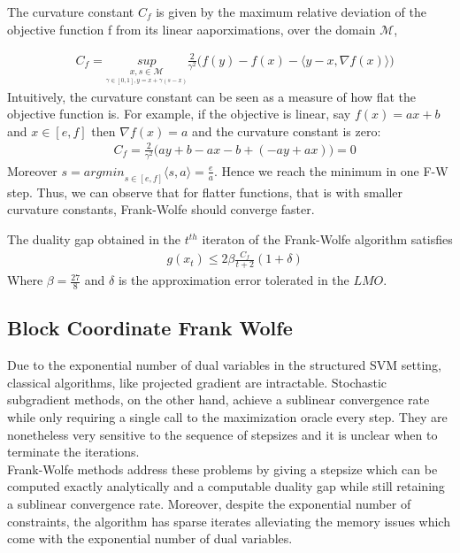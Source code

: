 \begin{definition}
  The curvature constant $C_{f}$ is given by the maximum relative deviation of
  the objective function f from its linear aaporximations, over the domain
  $\mathcal{M}$,
\end{definition}


\begin{align}
    &C_{f}= \underset{\underset{ \gamma\in[0,1],
y=x+\gamma(s-x)}{x,s\in\mathcal{M}}}{sup}\frac{2}{\gamma^{2}}\Big(f(y)- f(x)-
\langle y-x, \nabla f(x)\rangle\Big)
\end{align}
Intuitively, the curvature constant can be seen as a measure of how flat the
objective function is. For example, if the objective is linear, say $f(x)= ax+
b$ and $x\in[e,f]$ then $\nabla f(x)= a$ and the curvature constant is zero:
\begin{align}
    &C_{f}= \frac{2}{\gamma^{2}}\Big(ay+ b- ax- b +(-ay +ax)\Big)= 0
\end{align}
Moreover $s=\textit{argmin}_{s\in[e,f]}\langle s, a\rangle= \frac{e}{a}$. Hence
we reach the minimum in one F-W step. Thus, we can observe that for flatter
functions, that is with smaller curvature constants, Frank-Wolfe should converge
faster. 

\begin{theorem}
  The duality gap obtained in the $t^{th}$ iteraton of the Frank-Wolfe algorithm
satisfies
\begin{align}
    &g(x_{t})\leq 2\beta\frac{C_{f}}{t+2}(1+\delta)
\end{align}
Where $\beta= \frac{27}{8}$ and $\delta$ is the approximation error tolerated in
the $LMO$.
\end{theorem}

\subsection{Block Coordinate Frank Wolfe}
Due to the exponential number of dual variables in the structured SVM setting,
classical algorithms, like projected gradient are intractable. Stochastic
subgradient methods, on the other hand, achieve a sublinear convergence rate
while only requiring a single call to the maximization oracle every step. They
are nonetheless very sensitive to the sequence of stepsizes and it is unclear
when to terminate the iterations. \\

Frank-Wolfe methods address these problems by giving a stepsize which
can be computed exactly analytically and a computable duality gap while still
retaining a sublinear convergence rate. Moreover, despite the exponential number
of constraints, the algorithm has sparse iterates alleviating the memory issues
which come with the exponential number of dual variables.

